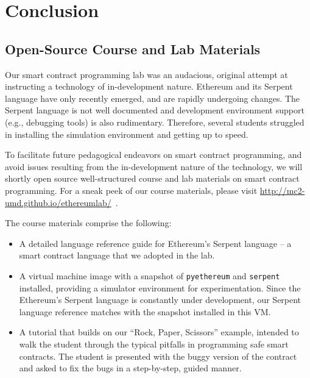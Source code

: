 \documentclass{llncs}
\newcommand{\elaine}[1]{}
\newcommand{\ignore}[1]{}
\begin{document}
\ignore{
\subsection{Fixed ``Rock, Paper, Scissors'' Contract} 
The full, fixed ``Rock, Paper, Scissors'' contract
is included in our open-source lab materials
available at 
~\cite{anonymousethlab}
}
\section{Conclusion}
\subsection{Open-Source Course and Lab Materials}
Our smart contract programming lab was an audacious, 
original attempt 
at instructing a technology of in-development nature.
Ethereum and its Serpent language
have only recently emerged, and are 
rapidly undergoing changes. 
The Serpent language is not well documented and development
environment support (e.g., debugging tools) 
is also rudimentary.
Therefore, several students struggled 
in installing the simulation environment and 
getting up to speed.

To facilitate future pedagogical endeavors on smart contract programming,
and avoid issues resulting from the in-development nature of the technology, 
we will shortly open source well-structured course and lab materials on
smart contract programming.
For a sneak peek of our course 
materials, please visit 
\url{http://mc2-umd.github.io/ethereumlab/}~\cite{anonymousethlab}.

The course materials comprise the following:
\begin{itemize}[leftmargin=5mm]
\item
A detailed language reference 
guide for Ethereum's Serpent language -- a
smart contract language that we adopted in the lab.
\item
A virtual machine image with a snapshot of {\tt pyethereum} and {\tt serpent} installed,
providing a simulator environment for experimentation.
Since the Ethereum's Serpent language is constantly
under development, our Serpent language
reference matches with the snapshot installed in this VM. 
\item
A tutorial that 
builds on our ``Rock, Paper, Scissors'' example, 
intended to 
walk the student through the typical pitfalls
in programming safe smart contracts.
The student is presented with the buggy version of the contract
and asked to fix the bugs in a step-by-step, guided manner.
\end{itemize}
\end{document}
